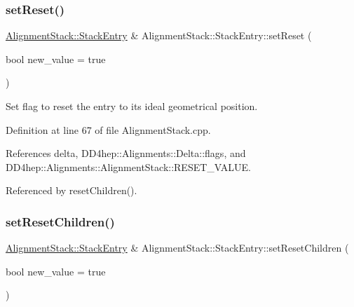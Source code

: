 \hypertarget{struct_d_d4hep_1_1_alignments_1_1_alignment_stack_1_1_stack_entry_acd99f7e6583a0c0b65dff2393eaa670c}{}\label{struct_d_d4hep_1_1_alignments_1_1_alignment_stack_1_1_stack_entry_acd99f7e6583a0c0b65dff2393eaa670c} 
\subsubsection{\texorpdfstring{set\+Reset()}{setReset()}}
{\footnotesize\ttfamily \hyperlink{struct_d_d4hep_1_1_alignments_1_1_alignment_stack_1_1_stack_entry}{Alignment\+Stack\+::\+Stack\+Entry} \& Alignment\+Stack\+::\+Stack\+Entry\+::set\+Reset (\begin{DoxyParamCaption}\item[{bool}]{new\+\_\+value = {\ttfamily true} }\end{DoxyParamCaption})}



Set flag to reset the entry to it\textquotesingle{}s ideal geometrical position. 



Definition at line 67 of file Alignment\+Stack.\+cpp.



References delta, D\+D4hep\+::\+Alignments\+::\+Delta\+::flags, and D\+D4hep\+::\+Alignments\+::\+Alignment\+Stack\+::\+R\+E\+S\+E\+T\+\_\+\+V\+A\+L\+UE.



Referenced by reset\+Children().

\hypertarget{struct_d_d4hep_1_1_alignments_1_1_alignment_stack_1_1_stack_entry_ad594ba553b888a578b961d11db56c3c9}{}\label{struct_d_d4hep_1_1_alignments_1_1_alignment_stack_1_1_stack_entry_ad594ba553b888a578b961d11db56c3c9} 
\subsubsection{\texorpdfstring{set\+Reset\+Children()}{setResetChildren()}}
{\footnotesize\ttfamily \hyperlink{struct_d_d4hep_1_1_alignments_1_1_alignment_stack_1_1_stack_entry}{Alignment\+Stack\+::\+Stack\+Entry} \& Alignment\+Stack\+::\+Stack\+Entry\+::set\+Reset\+Children (\begin{DoxyParamCaption}\item[{bool}]{new\+\_\+value = {\ttfamily true} }\end{DoxyParamCaption})}



